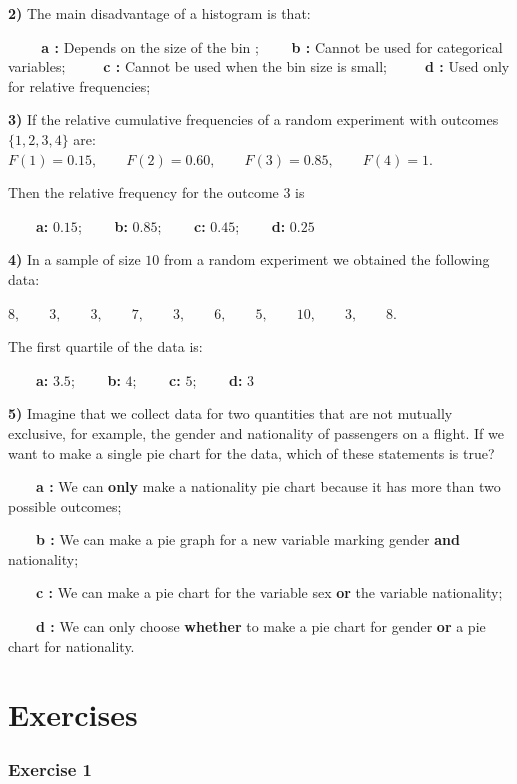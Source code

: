 \documentclass[
]{book}
\begin{document}
\textbf{2)} The main disadvantage of a histogram is that:

\textbf{\(\qquad\) a :} Depends on the size of the bin ; \textbf{\(\qquad\)b :} Cannot be used for categorical variables;
\textbf{\(\qquad\) c :} Cannot be used when the bin size is small;
\textbf{\(\qquad\) d :} Used only for relative frequencies;

\textbf{3)} If the relative cumulative frequencies of a random experiment with outcomes \(\{1,2,3,4\}\) are: \(F(1)=0.15, \qquad F(2)=0.60, \qquad F(3)=0.85, \qquad F(4)=1\).

Then the relative frequency for the outcome \(3\) is

\textbf{\(\qquad\)a:} \(0.15\); \textbf{\(\qquad\)b:} \(0.85\); \textbf{\(\qquad\)c:} \(0.45\); \textbf{\(\qquad\)d:} \(0.25\)

\textbf{4)} In a sample of size \(10\) from a random experiment we obtained the following data:

\(8, \qquad 3, \qquad 3, \qquad 7, \qquad 3, \qquad 6, \qquad 5, \qquad 10, \qquad 3, \qquad 8\).

The first quartile of the data is:

\textbf{\(\qquad\)a:} \(3.5\); \textbf{\(\qquad\)b:} \(4\); \textbf{\(\qquad\)c:} \(5\); \textbf{\(\qquad\)d:} \(3\)

\textbf{5)} Imagine that we collect data for two quantities that are not mutually exclusive, for example, the gender and nationality of passengers on a flight. If we want to make a single pie chart for the data, which of these statements is true?

\textbf{\(\qquad\)a :} We can \textbf{only} make a nationality pie chart because it has more than two possible outcomes;

\textbf{\(\qquad\)b :} We can make a pie graph for a new variable marking gender \textbf{and} nationality;

\textbf{\(\qquad\)c :} We can make a pie chart for the variable sex \textbf{or} the variable nationality;

\textbf{\(\qquad\)d :} We can only choose \textbf{whether} to make a pie chart for gender \textbf{or} a pie chart for nationality.

\hypertarget{exercises}{%
\section{Exercises}\label{exercises}}

\hypertarget{exercise-1}{%
\subsubsection{Exercise 1}\label{exercise-1}}
\end{document}
